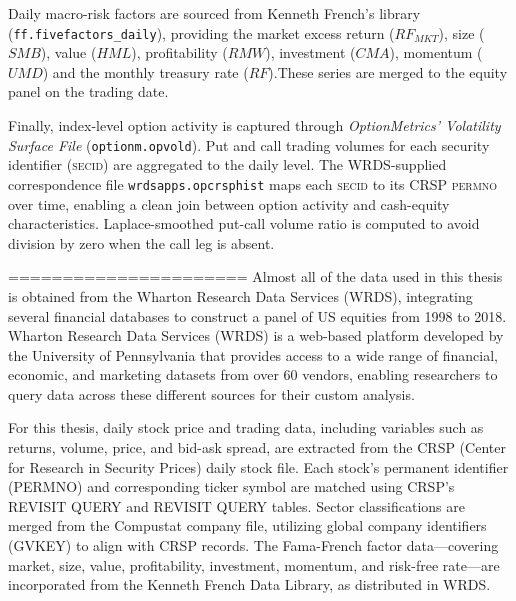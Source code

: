 Daily macro-risk factors are sourced from Kenneth French's library (\texttt{ff.fivefactors\_daily}), providing the market excess return ($RF_{MKT}$), size ($SMB$), value ($HML$), profitability ($RMW$), investment ($CMA$), momentum ($UMD$) and the monthly treasury rate ($RF$).These series are merged to the equity panel on the trading date.

Finally, index-level option activity is captured through \emph{OptionMetrics' Volatility Surface File} (\texttt{optionm.opvold}). Put and call trading volumes for each security identifier (\textsc{secid}) are aggregated to the daily level. The WRDS-supplied correspondence file \texttt{wrdsapps.opcrsphist} maps each \textsc{secid} to its CRSP \textsc{permno} over time, enabling a clean join between option activity and cash-equity characteristics. Laplace-smoothed put-call volume ratio is computed to avoid division by zero when the call leg is absent.

======================
Almost all of the data used in this thesis is obtained from the Wharton Research Data Services (WRDS), integrating several financial databases to construct a panel of US equities from 1998 to 2018. Wharton Research Data Services (WRDS) is a web-based platform developed by the University of Pennsylvania that provides access to a wide range of financial, economic, and marketing datasets from over 60 vendors, enabling researchers to query data across these different sources for their custom analysis. 

For this thesis, daily stock price and trading data, including variables such as returns, volume, price, and bid-ask spread, are extracted from the CRSP (Center for Research in Security Prices) daily stock file. Each stock's permanent identifier (PERMNO) and corresponding ticker symbol are matched using CRSP's {REVISIT QUERY} and {REVISIT QUERY} tables. Sector classifications are merged from the Compustat company file, utilizing global company identifiers (GVKEY) to align with CRSP records. The Fama-French factor data—covering market, size, value, profitability, investment, momentum, and risk-free rate—are incorporated from the Kenneth French Data Library, as distributed in WRDS.




